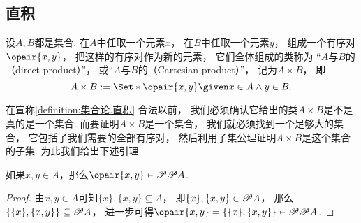 
\subsection{直积}
\begin{definition}\label{definition:集合论.直积}
设\(A,B\)都是集合.
在\(A\)中任取一个元素\(x\)，
在\(B\)中任取一个元素\(y\)，
组成一个有序对\(\opair{x,y}\)，
把这样的有序对作为新的元素，
它们全体组成的类称为
“\(A\)与\(B\)的（direct product）”，
或“\(A\)与\(B\)的（Cartesian product）”，
记为\(A \times B\)，
即\begin{equation}
	A \times B
	\defeq
	\Set*{ \opair{x,y} \given x \in A \land y \in B }.
\end{equation}
\end{definition}

在宣称\cref{definition:集合论.直积} 合法以前，
我们必须确认它给出的类\(A \times B\)是不是真的是一个集合.
而要证明\(A \times B\)是一个集合，
我们就必须找到一个足够大的集合，
它包括了我们需要的全部有序对，
然后利用子集公理证明\(A \times B\)是这个集合的子集.
为此我们给出下述引理.
\begin{lemma}\label{theorem:集合论.有序对是其坐标元素所在集合的二重幂集的元素}
如果\(x,y \in A\)，那么\(\opair{x,y} \in \Powerset\Powerset A\).
\begin{proof}
由\(x,y \in A\)可知\(\{x\},\{x,y\} \subseteq A\)，
即\(\{x\},\{x,y\} \in \mathscr{P} A\)，
那么\(\{\{x\},\{x,y\}\} \subseteq \mathscr{P} A\)，
进一步可得\(\opair{x,y} = \{\{x\},\{x,y\}\} \in \Powerset\Powerset A\).
\end{proof}
\end{lemma}

